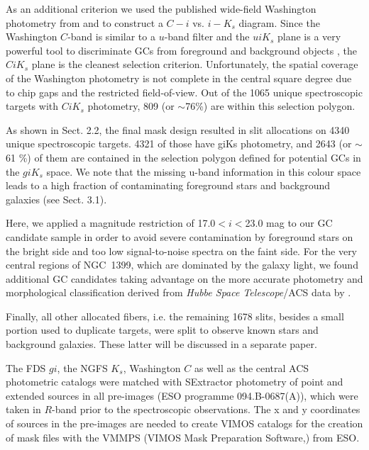 \documentclass[useAMS,usenatbib]{mn2e}
\begin{document}
As an additional criterion we used the published wide-field Washington 
photometry from \citet{Dirsch04} and \citet{Bassino} to construct a $C-i$ vs. 
$i-K_s$ diagram. Since the Washington $C$-band is similar to a $u$-band filter 
and the $uiK_s$ plane is a very powerful tool to discriminate GCs from 
foreground and background objects \citep{Munoz14}, the $CiK_s$ plane is the 
cleanest selection criterion. Unfortunately, the spatial coverage of the 
Washington photometry is not complete in the central square degree due to chip 
gaps and the restricted field-of-view. Out of the 1065 unique spectroscopic 
targets with $CiK_s$ photometry, 809 (or $\sim$76\%) are within this selection 
polygon.

As shown in Sect. 2.2, the final 
mask design resulted in slit allocations on 4340 unique spectroscopic targets. 
4321 of those have giKs photometry, and 2643 (or $\sim$ 61 \%) of them are 
contained in the selection polygon defined for potential GCs in the $giK_s$ space. 
We note that the missing u-band information in this colour space leads to a 
high fraction of contaminating foreground stars and background galaxies (see Sect. 3.1).

Here, we applied a magnitude restriction of 17.0$<i<$23.0 mag to our GC 
candidate sample in order to avoid severe contamination by foreground stars on 
the bright side and too low signal-to-noise spectra on the faint side. 
For the very central regions of NGC~1399, which are dominated by the galaxy 
light, we found additional GC candidates taking advantage on the more accurate 
photometry and morphological classification derived from {\it Hubbe Space 
Telescope}/ACS data by \citet{Puzia14}.

Finally, all other allocated fibers, i.e. the remaining 1678 slits, besides a 
small portion used to duplicate targets, were split to observe known stars and 
background galaxies. These latter will be discussed in a separate paper. 

The FDS $gi$, the NGFS $K_s$, Washington $C$ as well as the central ACS  
photometric catalogs were matched with SExtractor photometry of point and 
extended sources in all pre-images (ESO programme 094.B-0687(A)), which were 
taken in $R$-band prior to the spectroscopic observations. The x and y 
coordinates of sources in the pre-images are needed to create VIMOS catalogs 
for the creation of mask files with the VMMPS (VIMOS Mask Preparation 
Software,\citealt{Bottini05}) from ESO.
\end{document}
